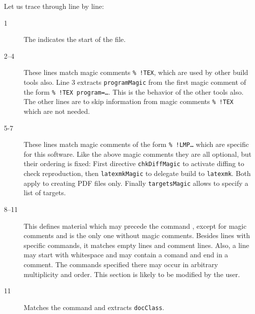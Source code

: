 
Let us trace through line by line: 
%
\begin{description}
  \item[1]
  The  indicates the start of the file. 
  \item[2--4]
  These lines match magic comments \texttt{\%~!TEX}, 
  which are used by other build tools also. 
  Line 3 extracts \texttt{programMagic} 
  from the first magic comment of the form \texttt{\%~!TEX program=\dots}. 
  This is the behavior of the other tools also. 
  The other lines are to skip information from magic comments \texttt{\%~!TEX} 
  which are not needed. 
  \item[5-7]
  These lines match magic comments of the form \texttt{\%~!LMP\dots} 
  which are specific for this software. 
  Like the above magic comments they are all optional, 
  but their ordering is fixed: First directive \texttt{chkDiffMagic} 
  to activate diffing to check reproduction, then \texttt{latexmkMagic} 
  to delegate build to \texttt{latexmk}. 
  Both apply to creating PDF files only. 
  Finally \texttt{targetsMagic} allows to specify a list of targets. 
  \item[8--11]
  This defines material which may precede the command , 
  except for magic comments and is the only one without magic comments. 
  Besides lines with specific commands, it matches empty lines and comment lines. 
  Also, a line may start with whitespace 
  and may contain a comand and end in a comment. 
  The commands specified there may occur in arbitrary multiplicity and order. 
  This section is likely to be modified by the user. 
  \item[11]
  Matches the command  and extracts \texttt{docClass}. 
\end{description}



